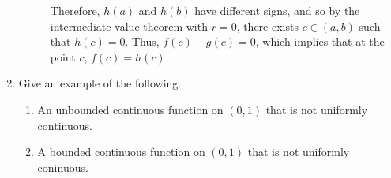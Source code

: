 \documentclass[12pt, a4paper]{article}
\begin{document}
\begin{enumerate}
\begin{description}
        Therefore, $h(a)$ and $h(b)$ have different signs, and so by the intermediate value theorem with $r=0$, there exists $c\in(a,b)$ such that $h(c)=0$. Thus, $f(c)-g(c)=0$, which implies that at the point $c$, $f(c)=h(c)$.
    \end{description}
    
    \item Give an example of the following.
    
    \begin{enumerate}[label=(\alph*)]
        \item An unbounded continuous function on $(0,1)$ that is not uniformly continuous. 
        
        
        \item A bounded continuous function on $(0,1)$ that is not uniformly coninuous.
        
    \end{enumerate}
    
\end{enumerate}
\end{document}
